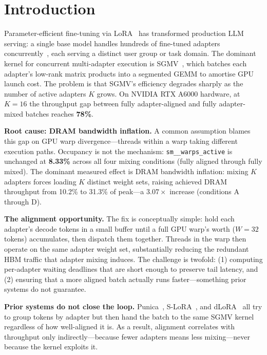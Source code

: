 \documentclass[conference]{IEEEtran}
\begin{document}
\sloppy

\section{Introduction}
\label{sec:intro}

Parameter-efficient fine-tuning via LoRA~\cite{hu2021lora} has transformed
production LLM serving: a single base model handles hundreds of fine-tuned
adapters concurrently~\cite{kwon2023vllm,yu2022orca}, each serving a distinct
user group or task domain.
The dominant kernel for concurrent multi-adapter execution is
SGMV~\cite{chen2024punica}, which batches each adapter's low-rank matrix
products into a segmented GEMM to amortise GPU launch cost.
The problem is that SGMV's efficiency degrades sharply as the number of active
adapters $K$ grows.
On NVIDIA RTX A6000 hardware, at $K{=}16$ the throughput gap between
fully adapter-aligned and fully adapter-mixed batches reaches \textbf{78\%}.

\textbf{Root cause: DRAM bandwidth inflation.}
A common assumption blames this gap on GPU warp divergence---threads
within a warp taking different execution paths.
Occupancy is not the mechanism: \texttt{sm\_\_warps\_active} is unchanged at
\textbf{8.33\%} across all four mixing conditions (fully aligned through fully
mixed).
The dominant measured effect is DRAM bandwidth inflation: mixing $K$ adapters forces
loading $K$ distinct weight sets, raising achieved DRAM throughput from
10.2\% to 31.3\% of peak---a $3.07{\times}$ increase (conditions A through D).

\textbf{The alignment opportunity.}
The fix is conceptually simple: hold each adapter's decode tokens in a small
buffer until a full GPU warp's worth ($W{=}32$ tokens) accumulates, then
dispatch them together.
Threads in the warp then operate on the same adapter weight set, substantially
reducing the redundant HBM traffic that adapter mixing induces.
The challenge is twofold: (1) computing per-adapter waiting deadlines that
are short enough to preserve tail latency, and (2) ensuring that a more
aligned batch actually runs faster---something prior systems do not guarantee.

\textbf{Prior systems do not close the loop.}
Punica~\cite{chen2024punica}, S-LoRA~\cite{sheng2023slora}, and
dLoRA~\cite{wu2024dlora} all try to group tokens by adapter but then hand the
batch to the same SGMV kernel regardless of how well-aligned it is.
As a result, alignment correlates with throughput only indirectly---because
fewer adapters means less mixing---never because the kernel exploits it.
\end{document}
